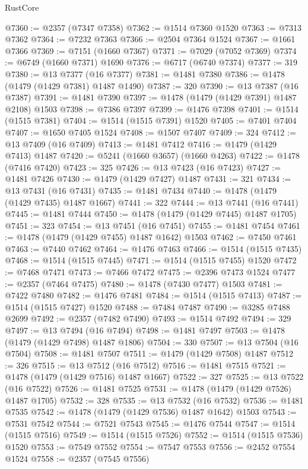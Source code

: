 \begin{lexlean}{RustCore}
\begin{coremodule}
@7360 := @2357 (@7347 @7358)
@7362 := @1514 @7360 @1520
@7363 := @7313 @7362
@7364 := @7232 @7363
@7366 := @2504 @7364 @1524
@7367 := @1661 @7366
@7369 := @7151 (@1660 @7367)
@7371 := @7029 (@7052 @7369)
@7374 := @6749 (@1660 @7371) @1690
@7376 := @6717 (@6740 @7374)
@7377 := 319
@7380 := @13 @7377 (@16 @7377)
@7381 := @1481 @7380
@7386 := @1478 (@1479 (@1429 @7381) @1487 @1490)
@7387 := 320
@7390 := @13 @7387 (@16 @7387)
@7391 := @1481 @7390
@7397 := @1478 (@1479 (@1429 @7391) @1487 @2108) @1503
@7398 := @7386 @7397
@7399 := @1476 @7398
@7401 := @1514 (@1515 @7381)
@7404 := @1514 (@1515 @7391) @1520
@7405 := @7401 @7404
@7407 := @1650 @7405 @1524
@7408 := @1507 @7407
@7409 := 324
@7412 := @13 @7409 (@16 @7409)
@7413 := @1481 @7412
@7416 := @1479 (@1429 @7413) @1487
@7420 := @5241 (@1660 @3657) (@1660 @4263)
@7422 := @1478 (@7416 @7420)
@7423 := 325
@7426 := @13 @7423 (@16 @7423)
@7427 := @1481 @7426
@7430 := @1479 (@1429 @7427) @1487
@7431 := 321
@7434 := @13 @7431 (@16 @7431)
@7435 := @1481 @7434
@7440 := @1478 (@1479 (@1429 @7435) @1487 @1667)
@7441 := 322
@7444 := @13 @7441 (@16 @7441)
@7445 := @1481 @7444
@7450 := @1478 (@1479 (@1429 @7445) @1487 @1705)
@7451 := 323
@7454 := @13 @7451 (@16 @7451)
@7455 := @1481 @7454
@7461 := @1478 (@1479 (@1429 @7455) @1487 @1642) @1503
@7462 := @7450 @7461
@7463 := @7440 @7462
@7464 := @1476 @7463
@7466 := @1514 (@1515 @7435)
@7468 := @1514 (@1515 @7445)
@7471 := @1514 (@1515 @7455) @1520
@7472 := @7468 @7471
@7473 := @7466 @7472
@7475 := @2396 @7473 @1524
@7477 := @2357 (@7464 @7475)
@7480 := @1478 (@7430 @7477) @1503
@7481 := @7422 @7480
@7482 := @1476 @7481
@7484 := @1514 (@1515 @7413)
@7487 := @1514 (@1515 @7427) @1520
@7488 := @7484 @7487
@7490 := @3285 @7488 @2699
@7492 := @2357 (@7482 @7490)
@7493 := @1514 @7492
@7494 := 329
@7497 := @13 @7494 (@16 @7494)
@7498 := @1481 @7497
@7503 := @1478 (@1479 (@1429 @7498) @1487 @1806)
@7504 := 330
@7507 := @13 @7504 (@16 @7504)
@7508 := @1481 @7507
@7511 := @1479 (@1429 @7508) @1487
@7512 := 326
@7515 := @13 @7512 (@16 @7512)
@7516 := @1481 @7515
@7521 := @1478 (@1479 (@1429 @7516) @1487 @1667)
@7522 := 327
@7525 := @13 @7522 (@16 @7522)
@7526 := @1481 @7525
@7531 := @1478 (@1479 (@1429 @7526) @1487 @1705)
@7532 := 328
@7535 := @13 @7532 (@16 @7532)
@7536 := @1481 @7535
@7542 := @1478 (@1479 (@1429 @7536) @1487 @1642) @1503
@7543 := @7531 @7542
@7544 := @7521 @7543
@7545 := @1476 @7544
@7547 := @1514 (@1515 @7516)
@7549 := @1514 (@1515 @7526)
@7552 := @1514 (@1515 @7536) @1520
@7553 := @7549 @7552
@7554 := @7547 @7553
@7556 := @2452 @7554 @1524
@7558 := @2357 (@7545 @7556)

\end{coremodule}
\end{lexlean}
